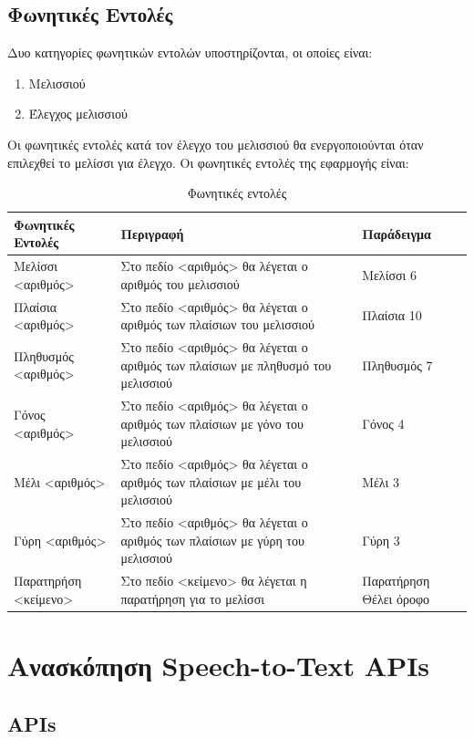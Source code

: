 \documentclass[oneside, 12pt]{book}
\begin{document}
\section{Φωνητικές Εντολές}
\label{sec:φωνητικές-εντολές}
Δυο κατηγορίες φωνητικών εντολών υποστηρίζονται, οι οποίες είναι:
\begin{enumerate}
  \item Μελισσιού
  \item Έλεγχος μελισσιού
\end{enumerate}
Οι φωνητικές εντολές κατά τον έλεγχο του μελισσιού θα ενεργοποιούνται όταν επιλεχθεί το μελίσσι για έλεγχο.
Οι φωνητικές εντολές της εφαρμογής είναι:
\begin{table}[h]
  \centering
  \caption{Φωνητικές εντολές}
  \begin{tabularx}{\linewidth}[h]{|X|X|X|}
    \hline
    Φωνητικές Εντολές & Περιγραφή & Παράδειγμα \\
    \hline
    \hline
    Μελίσσι <αριθμός> & Στο πεδίο <αριθμός> θα λέγεται ο αριθμός του μελισσιού & Μελίσσι 6 \\
    \hline
    Πλαίσια <αριθμός> & Στο πεδίο <αριθμός> θα λέγεται ο αριθμός των πλαίσιων του μελισσιού & Πλαίσια 10 \\
    \hline
    Πληθυσμός <αριθμός> & Στο πεδίο <αριθμός> θα λέγεται ο αριθμός των πλαίσιων με πληθυσμό του μελισσιού & Πληθυσμός 7 \\
    \hline
    Γόνος <αριθμός> & Στο πεδίο <αριθμός> θα λέγεται ο αριθμός των πλαίσιων με γόνο του μελισσιού & Γόνος 4 \\
    \hline
    Μέλι <αριθμός> & Στο πεδίο <αριθμός> θα λέγεται ο αριθμός των πλαίσιων με μέλι του μελισσιού & Μέλι 3 \\
    \hline
    Γύρη <αριθμός> & Στο πεδίο <αριθμός> θα λέγεται ο αριθμός των πλαίσιων με γύρη του μελισσιού & Γύρη 3 \\
    \hline
    Παρατηρήση <κείμενο> & Στο πεδίο <κείμενο> θα λέγεται η παρατήρηση για το μελίσσι & Παρατήρηση Θέλει όροφο  \\
    \hline
  \end{tabularx}
  \label{tab:table3}
\end{table}
\chapter{Ανασκόπηση Speech-to-Text APIs}
\label{ch:ανασκόπηση-speech-to-text-apis}
\section{APIs}
\label{sec:apis}
\end{document}
